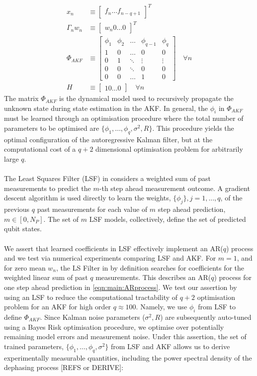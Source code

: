 \begin{align}
x_n & \equiv  \begin{bmatrix} f_{n} \hdots f_{n-q+1} \end{bmatrix}^T \\
\Gamma_n w_n & \equiv \begin{bmatrix} w_{n} 0 \hdots 0 \end{bmatrix}^T \\
\Phi_{AKF} & \equiv 
\begin{bmatrix}
\phi_1 & \phi_2 & \hdots & \phi_{q-1} & \phi_q \\ 
1 & 0 & \hdots & 0 & 0 \\  
0 & 1 & \ddots & \vdots & \vdots \\ 
0 & 0 & \ddots & 0 & 0 \\ 
0 & 0 & \hdots & 1 & 0 
\end{bmatrix} \quad \forall n \label{eqn:akf_Phi} \\
H & \equiv \begin{bmatrix} 1 0 \hdots 0 \end{bmatrix} \quad \forall n 
\end{align}
The matrix $\Phi_{AKF}$ is the dynamical model used to recursively propagate the unknown state during state estimation in the AKF. In general, the ${\phi_i}$ in $\Phi_{AKF}$ must be learned through an optimisation procedure where the total number of parameters to be optimised are $\{\phi_1, \hdots, \phi_q, \sigma^2, R \}$. This procedure yields the optimal configuration of the autoregressive Kalman filter, but at the computational cost of a $q+2$ dimensional optimisation problem for arbitrarily large $q$.
\\
\\
The Least Squares Filter (LSF) in \cite{mavadia2017} considers a weighted sum of past measurements to predict the $m$-th step ahead measurement outcome. A gradient descent algorithm is used directly to learn the weights, $\{\phi_j\}, j = 1, ... , q $, of the previous $q$ past measurements for each value of $m$ step ahead prediction, $m \in [0, N_P]$. The set of $m$ LSF models, collectively, define the set of predicted qubit states.  
\\
\\
We assert that learned coefficients in LSF effectively implement an AR($q$) process and we test via numerical experiments comparing LSF and AKF. For $m=1$, and for zero mean $w_n$, the LS Filter in \cite{mavadia2017} by definition searches for coefficients for the weighted linear sum of past $q$ measurements. This describes an AR($q$) process for one step ahead prediction in \cref{eqn:main:ARprocess}. We test our assertion by using an LSF to reduce the computational tractability of $q+2$ optimisation problem for an AKF for high order $q \approx 100$. Namely, we use ${\phi_i}$ from LSF to define $\Phi_{AKF}$. Since Kalman noise parameters ($\sigma^2, R$) are subsequently auto-tuned using a Bayes Risk optimisation procedure, we optimise over potentially remaining model errors and measurement noise. Under this assertion, the set of trained parameters, $\{\phi_1, \hdots, \phi_q, \sigma^2\}$ from LSF and AKF allows us to derive experimentally measurable quantities, including the power spectral density of the dephasing process [REFS or DERIVE]:
